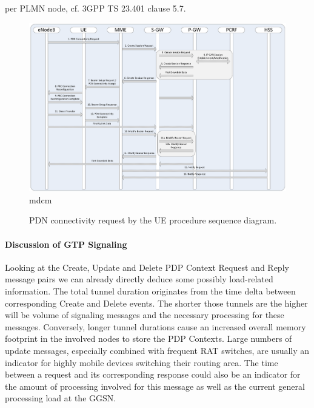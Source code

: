 per \gls{PLMN} node, cf. \gls{3GPP} \gls{TS} 23.401 clause 5.7.

\begin{figure}[htb]
	\centering
	\includegraphics[width=1.2\textwidth]{images/UE-requested-PDN-connectivity.pdf}
mdcm	\caption{\gls{PDN} connectivity request by the UE procedure sequence diagram.}
	\label{c4:fig:3gpp-uepdnreq}
\end{figure}



\paragraph{Discussion of GTP Signaling}

Looking at the Create, Update and Delete PDP Context Request and Reply message pairs we can already directly deduce some possibly load-related information. The total tunnel duration originates from the time delta between corresponding Create and Delete events. The shorter those tunnels are the higher will be volume of signaling messages and the necessary processing for these messages. Conversely, longer tunnel durations cause an increased overall memory footprint in the involved nodes to store the \gls{PDP} Contexts. Large numbers of update messages, especially combined with frequent \gls{RAT} switches, are usually an indicator for highly mobile devices switching their routing area. 
The time between a request and its corresponding response could also be an indicator for the amount of processing involved for this message as well as the current general processing load at the \gls{GGSN}.

